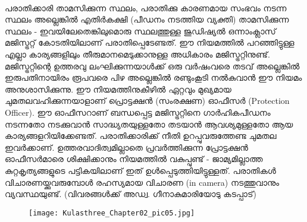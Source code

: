 \begin{tcolorbox}[%
  breakable, %
  arc=0mm, 
  left=1pt, right = 1pt, 
  boxrule=0mm,
  colback = {blue!10}, %
]
\paragraph{}പരാതിക്കാരി താമസിക്കുന്ന സ്ഥലം, പരാതിക്കു കാരണമായ സംഭവം നടന്ന സ്ഥലം അല്ലെങ്കിൽ എതിർകക്ഷി (പീഡനം നടത്തിയ വ്യക്തി) താമസിക്കുന്ന സ്ഥലം - ഇവയിലേതെങ്കിലുമൊരു സ്ഥലത്തുള്ള ജുഡിഷ്യൽ ഒന്നാംക്ലാസ് മജിസ്ട്രറ്റ് കോടതിയിലാണ് പരാതിപ്പെടേണ്ടത്. ഈ നിയമത്തിൽ പറഞ്ഞിട്ടുള്ള എല്ലാ കാര്യങ്ങളിലും തീരുമാനമെടുക്കാനുള്ള അധികാരം മജിസ്ട്രറ്റിനുണ്ട്. മജിസ്ട്രറ്റിന്റെ ഉത്തരവു ലംഘിക്കുന്നയാൾക്ക് ഒരു വർഷംവരെ തടവ് അല്ലെങ്കിൽ ഇരുപതിനായിരം രൂപവരെ പിഴ അല്ലെങ്കിൽ രണ്ടുംകൂടി നൽകുവാൻ ഈ നിയമം അനുശാസിക്കുന്നു. ഈ നിയമത്തിനുകീഴിൽ ഏറ്റവും മുഖ്യമായ ചുമതലവഹിക്കുന്നയാളാണ് പ്രൊട്ടക്ഷൻ (സംരക്ഷണ) ഓഫീസർ (Protection Officer). ഈ ഓഫീസറാണ് ബന്ധപ്പെട്ട മജിസ്ട്രറ്റിനെ ഗാർഹികപീഡനം നടന്നതോ നടക്കുവാൻ സാദ്ധ്യതയുള്ളതോ തടയാൻ ആവശ്യമുള്ളതോ ആയ കാര്യങ്ങളറിയിക്കേണ്ടത്. പരാതിക്കാരിക്ക് നീതി ഉറപ്പുവരുത്തേണ്ട ചുമതല ഇവർക്കാണ്. ഉത്തരവാദിത്വമില്ലാതെ പ്രവർത്തിക്കുന്ന പ്രോട്ടക്ഷൻ ഓഫീസർമാരെ ശിക്ഷിക്കാനും നിയമത്തിൽ വകുപ്പുണ്ട് - ജാമ്യമില്ലാത്ത കുറ്റകൃത്യങ്ങളുടെ പട്ടികയിലാണ് ഇത് ഉൾപ്പെടുത്തിയിട്ടുള്ളത്. പരാതികൾ വിചാരണയ്ക്കുവരുമ്പോൾ രഹസ്യമായ വിചാരണ (in camera) നടത്തുവാനും വ്യവസ്ഥയുണ്ട്.
(വിവരങ്ങൾക്ക് അഡ്വ. ഗീനാകുമാരിയോടു കടപ്പാട്)
\end{tcolorbox}

\begin{figure}[h]
\begin{center}
\texttt{[image: Kulasthree\_Chapter02\_pic05.jpg]}
\end{center}
\end{figure}



